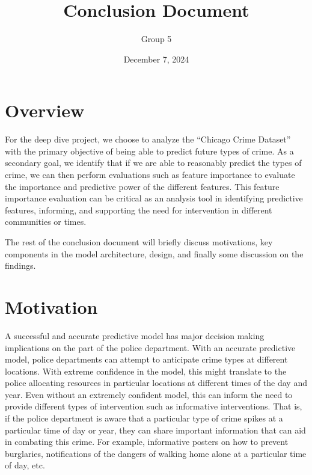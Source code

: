 \documentclass{article}
\author{Group 5}
\date{December 7, 2024}
\title{Conclusion Document}
\begin{document}
\maketitle

\section{Overview}

For the deep dive project, we choose to analyze the “Chicago Crime Dataset” with the primary objective of being able to predict future types of crime. As a secondary goal, we identify that if we are able to reasonably predict the types of crime, we can then perform evaluations such as feature importance to evaluate the importance and predictive power of the different features. This feature importance evaluation can be critical as an analysis tool in identifying predictive features, informing, and supporting the need for intervention in different communities or times. 

The rest of the conclusion document will briefly discuss motivations, key components in the model architecture, design, and finally some discussion on the findings.

\section{Motivation}

A successful and accurate predictive model has major decision making implications on the part of the police department. With an accurate predictive model, police departments can attempt to anticipate crime types at different locations. With extreme confidence in the model, this might translate to the police allocating resources in particular locations at different times of the day and year. Even without an extremely confident model, this can inform the need to provide different types of intervention such as informative interventions. That is, if the police department is aware that a particular type of crime spikes at a particular time of day or year, they can share important information that can aid in combating this crime. For example, informative posters on how to prevent burglaries, notifications of the dangers of walking home alone at a particular time of day, etc. 
\end{document}
